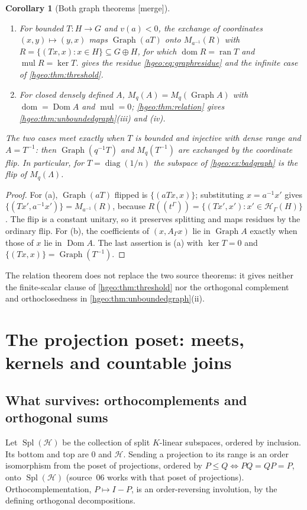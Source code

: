 \documentclass[11pt,letterpaper]{article}
\numberwithin{equation}{section}
\newtheorem{corollary}[corollary]{Corollary}
\theoremstyle{definition}
\theoremstyle{remark}
\newcommand{\K}{K}
\newcommand{\HH}[1]{\mathscr H_\Gamma(#1)}
\newcommand{\ran}{\operatorname{ran}}
\newcommand{\Dom}{\operatorname{Dom}}
\newcommand{\dom}{\operatorname{dom}}
\newcommand{\mul}{\operatorname{mul}}
\newcommand{\Graph}{\operatorname{Graph}}
\newcommand{\diag}{\operatorname{diag}}
\newcommand{\cH}{\mathcal H}
\newcommand{\Spl}{\operatorname{Spl}}
\newcommand{\mergetag}{\textup{\textsf{\small[merge]}}}
\begin{document}
\begin{corollary}[Both graph theorems \mergetag]\label{hgeo:cor:bothgraphs}
\begin{enumerate}[label=\textup{(\alph*)}]
\item For bounded $T:H\to G$ and $v(a)<0$, the exchange of coordinates
$(x,y)\mapsto(y,x)$ maps $\Graph(aT)$ onto $M_{a^{-1}}(R)$ with
$R=\{(Tx,x):x\in H\}\subseteq G\oplus H$, for which $\dom R=\ran T$ and
$\mul R=\ker T$.  gives the residue
\eqref{hgeo:eq:graphresidue} and the infinite case of
\cref{hgeo:thm:threshold}.
\item For closed densely defined $A$, $M_q(A)=M_q(\Graph A)$ with
$\dom=\Dom A$ and $\mul=0$; \cref{hgeo:thm:relation} gives
\cref{hgeo:thm:unboundedgraph}(iii) and (iv).
\end{enumerate}
The two cases meet exactly when $T$ is bounded and injective with dense
range and $A=T^{-1}$: then $\Graph(q^{-1}T)$ and $M_q(T^{-1})$ are exchanged
by the coordinate flip. In particular, for $T=\diag(1/n)$ the subspace of
\cref{hgeo:ex:badgraph} is the flip of $M_q(\Lambda)$.
\end{corollary}
\begin{proof}
For (a), $\Graph(aT)$ flipped is $\{(aTx,x)\}$; substituting $x=a^{-1}x'$
gives $\{(Tx',a^{-1}x')\}=M_{a^{-1}}(R)$, because $R((t^\Gamma))=
\{(Tx',x'):x'\in\HH{H}\}$. The flip is a constant unitary, so it preserves
splitting and maps residues by the ordinary flip. For (b), the coefficients
of $(x,A_\Gamma x)$ lie in $\Graph A$ exactly when those of $x$ lie in
$\Dom A$. The last assertion is (a) with $\ker T=0$ and
$\{(Tx,x)\}=\Graph(T^{-1})$.
\end{proof}

The relation theorem does not replace the two source theorems: it gives
neither the finite-scalar clause of \cref{hgeo:thm:threshold} nor the
orthogonal complement and orthoclosedness in
\cref{hgeo:thm:unboundedgraph}(ii).

\section{The projection poset: meets, kernels and countable joins}
\label{hgeo:sec:lattice}

\subsection{What survives: orthocomplements and orthogonal sums}
Let $\Spl(\cH)$ be the collection of split $\K$-linear subspaces,
ordered by inclusion. Its bottom and top are $0$ and $\cH$. Sending a
projection to its range is an order isomorphism from the poset of
projections, ordered by $P\le Q\iff PQ=QP=P$, onto $\Spl(\cH)$ (source~06
works with that poset of projections). Orthocomplementation, $P\mapsto I-P$,
is an order-reversing involution, by the defining orthogonal decompositions.
\end{document}
